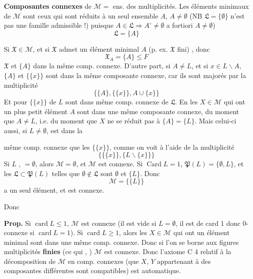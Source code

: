 \documentclass[11pt,a4paper]{article}
\begin{document}

\textbf{Composantes connexes} de $\mathcal{M} =$ ens. des multiplicités. Les éléments minimaux de $\mathcal{M}$ sont ceux qui sont réduits à un seul ensemble $A$,  $A \neq \emptyset$ (NB $\mathfrak{L} = \{\emptyset\}$ n'est pas une famille admissible !)  puisque $A \in \mathfrak{L} \Rightarrow A^{\circ} \neq \emptyset$ a fortiori $A \neq \emptyset$)
\[
  \mathfrak{L} = \{A\}
\]

Si $\mathfrak{X} \in \mathcal{M}$,  et si $\mathfrak{X}$ admet un \struck{\ill{}} élément minimal $A$ (p. ex. $\mathfrak{X}$ fini) , donc
\[
  \mathfrak{X}_A = \{A\} \leq F
\]
 $\mathfrak{X}$ et $\{A\}$ dans la même comp. connexe. D'autre part, \struck{\ill{}} si $A \neq L$, et si $x \in L \smallsetminus A$, $\{A\}$ et $\{\{x\}\}$ sont dans la même composante connexe, car ils sont majorés par la multiplicité
\[
  \bigl\{ \{A\}, \{\{x\}\}, A \cup \{x\} \bigr\}
\]
Et pour $\{\{x\}\}$  \struck{\ill{}} de $L$ sont dans \ill{} même comp. connexe de $\mathfrak{L}$. En \ill{} les $X \in \mathcal{M}$ qui ont un plus petit élément $A$ sont dans une même composante connexe, du moment que $A \neq L$, i.e. du moment que $X$ ne se réduit pas à $\{A\} = \{L\}$. Mais celui-ci aussi, si \struck{\ill{}} $L \neq \emptyset$, est dans la

même comp. connexe que les $\{\{x\}\}$, comme on voit à l'aide de la multiplicité
\[
  \bigl\{ \{\{x\}\}, \{L \smallsetminus \{x\}\} \bigr\}
\]
Si $L$ , $= \emptyset$,  alors $\mathcal{M} = \emptyset$, et $\mathcal{M}$ est connexe. Si $\operatorname{Card} L = 1$, $\mathfrak{P}(L) = \{\emptyset, L\}$, et les $\mathfrak{L} \subset \mathfrak{P}(L)$  telles que  $\emptyset \notin \mathfrak{L}$ sont $\emptyset$ et $\{L\}$. Donc
\[
  \mathcal{M} = \{\{L\}\}
\]
a un seul élément, et est connexe.

Donc

\textbf{Prop.} Si $\operatorname{card} L \leq 1$, $\mathcal{M}$ est connexe (il est vide si $L = \emptyset$, il est de card 1 donc 0-connexe si $\operatorname{card} L = 1$). Si $\operatorname{card} L \geq 1$, alors les $X \in \mathcal{M}$ qui ont un élément minimal sont dans une même comp. connexe. Donc si l'on se borne aux  figures  multiplicités \textbf{finies} (ce qui , ) $\mathcal{M}$ \ill{} est connexe. Donc l'axiome C 4  relatif à la décomposition de $\mathcal{M}$ en comp. connexes (que $X$, $Y$ appartenant à des composantes différentes sont compatibles) est automatique.
\end{document}
